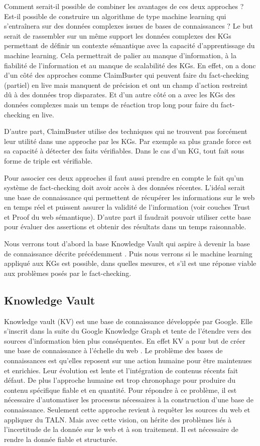 Comment serait-il possible de combiner les avantages de ces deux approches ? Est-il possible de construire un algorithme de type machine learning qui s'entraînera sur des données complexes issues de bases de connaissances ? Le but serait de rassembler sur un même support les données complexes des KGs permettant de définir un contexte sémantique avec la capacité d'apprentissage du machine learning. Cela permettrait de palier au manque d'information, à la fiabilité de l'information et au manque de scalabilité des KGs. En effet, on a donc d'un côté des approches comme ClaimBuster qui peuvent faire du fact-checking (partiel) en live mais manquent de précision et ont un champ d'action restreint dû à des données trop disparates. Et d'un autre côté on a avec les KGs des données complexes mais un temps de réaction trop long pour faire du fact-checking en live.

D'autre part, ClaimBuster utilise des techniques qui ne trouvent pas forcément leur utilité dans une approche par les KGs. Par exemple sa plus grande force est sa capacité à détecter des faits vérifiables. Dans le cas d'un KG, tout fait sous forme de triple est vérifiable.

Pour associer ces deux approches il faut aussi prendre en compte le fait qu'un système de fact-checking doit avoir accès à des données récentes. L'idéal serait une base de connaissance qui permettent de récupérer les informations sur le web en temps réel et puissent assurer la validité de l'information (voir couches Trust et Proof du web sémantique). D'autre part il faudrait pouvoir utiliser cette base pour évaluer des assertions et obtenir des résultats dans un temps raisonnable.

Nous verrons tout d'abord la base Knowledge Vault qui aspire à devenir la base de connaissance décrite précédemment \cite{dong2014knowledge}. Puis nous verrons si le machine learning appliqué aux KGs est possible, dans quelles mesures, et s'il est une réponse viable aux problèmes posés par le fact-checking.

\subsection{Knowledge Vault}

Knowledge vault (KV) est une base de connaissance développée par Google. Elle s'inscrit dans la suite du Google Knowledge Graph et tente de l'étendre vers des sources d'information bien plus conséquentes. En effet KV a pour but de créer une base de connaissance à l'échelle du web \cite{dong2014knowledge}. Le problème des bases de connaissances est qu'elles reposent sur une action humaine pour être maintenues et enrichies. Leur évolution est lente et l'intégration de contenus récents fait défaut. De plus l'approche humaine est trop chronophage pour produire du contenu spécifique fiable et en quantité. Pour répondre à ce problème, il est nécessaire d'automatiser les processus nécessaires à la construction d'une base de connaissance. Seulement cette approche revient à requêter les sources du web et appliquer du TALN. Mais avec cette vision, on hérite des problèmes liés à l'incertitude de la donnée sur le web et à son traitement. Il est nécessaire de rendre la donnée fiable et structurée.


